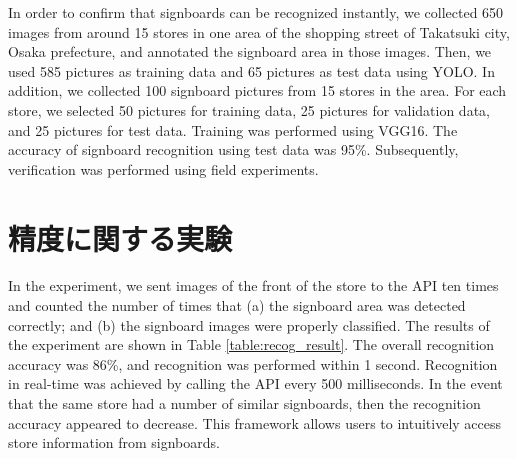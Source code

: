   In order to confirm that signboards can be recognized instantly, %
  we collected 650 images from around 15 stores in one area of the shopping street of Takatsuki city, Osaka prefecture,
  and annotated the signboard area in those images.
  Then, we used 585 pictures as training data and 65 pictures as test data using YOLO.
  In addition, we collected 100 signboard pictures from 15 stores in the area.
  For each store, we selected 50 pictures for training data, 25 pictures for validation data,  and 25 pictures for test data. Training was performed using VGG16.
  The accuracy of signboard recognition using test data was 95\%.
  Subsequently, verification was performed using field experiments.

\section{精度に関する実験}
  In the experiment, we sent images of the front of the store to the API ten times and counted the number of times that (a) the signboard area was detected correctly; and (b) the signboard images were properly classified.
  The results of the experiment are shown in Table \ref{table:recog_result}.
  The overall recognition accuracy was 86\%, and recognition was performed within 1 second.
  Recognition in real-time was achieved by calling the API every 500 milliseconds.
  In the event that the same store had a number of similar signboards, then the recognition accuracy appeared to decrease.
  This framework allows users to intuitively access store information from signboards.

